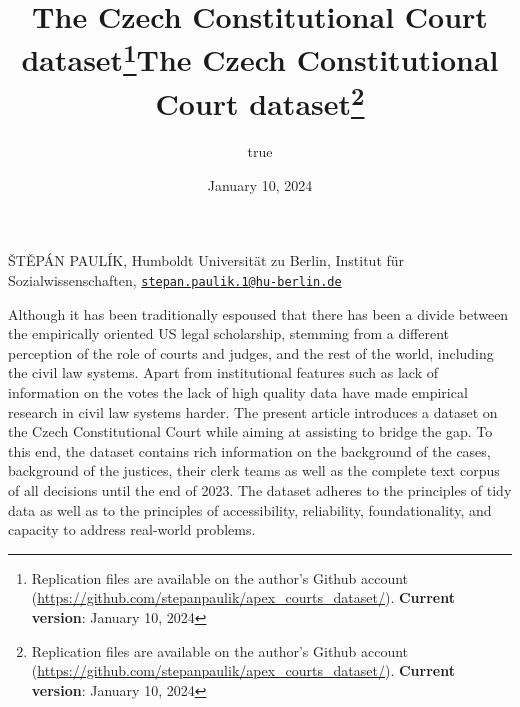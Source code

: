 \documentclass[
  11pt,
]{article}
\title{The Czech Constitutional Court dataset\thanks{Replication files
are available on the author's Github account
(\url{https://github.com/stepanpaulik/apex_courts_dataset/}).
\textbf{Current version}: January 10, 2024}}
\author{true}
\date{January 10, 2024}
\title{The Czech Constitutional Court dataset\thanks{Replication files
are available on the author's Github account
(\url{https://github.com/stepanpaulik/apex_courts_dataset/}).
\textbf{Current version}: January 10, 2024}  }
\date{}
\renewenvironment{abstract}
 {{%
    \setlength{\leftmargin}{0mm}
    \setlength{\rightmargin}{\leftmargin}%
  }%
  \relax}
 {\endlist}
\begin{document}



{%
\setlength{\parindent}{0pt}
\thispagestyle{plain}
{%
\maketitle  %

}




{
   \vskip 13.5pt\relax \normalsize\fontsize{11}{12}
   \MakeUppercase{Štěpán Paulík}, \small{Humboldt Universität zu Berlin,
Institut für Sozialwissenschaften,
\href{mailto:stepan.paulik.1@hu-berlin.de}{\nolinkurl{stepan.paulik.1@hu-berlin.de}}}   

}

}








\begin{abstract}


    \vskip 8.5pt %

\noindent \small{Although it has been traditionally espoused that there
has been a divide between the empirically oriented US legal scholarship,
stemming from a different perception of the role of courts and judges,
and the rest of the world, including the civil law systems. Apart from
institutional features such as lack of information on the votes the lack
of high quality data have made empirical research in civil law systems
harder. The present article introduces a dataset on the Czech
Constitutional Court while aiming at assisting to bridge the gap. To
this end, the dataset contains rich information on the background of the
cases, background of the justices, their clerk teams as well as the
complete text corpus of all decisions until the end of 2023. The dataset
adheres to the principles of tidy data as well as to the principles of
accessibility, reliability, foundationality, and capacity to address
real-world problems.}




\end{abstract}
\end{document}
